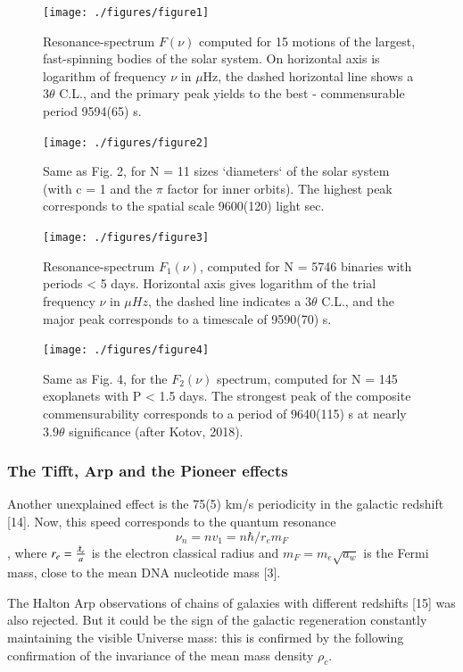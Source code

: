 \documentclass[twoside,draft]{article}
\begin{document}
\begin{sloppypar}
{\begin{figure}
\centering
\texttt{[image: ./figures/figure1]}
\caption{Resonance-spectrum $F(\nu)$ computed for 15 motions of the largest, fast-spinning bodies of
the solar system. On horizontal axis is logarithm of frequency $\nu$ in $\mu$Hz, the dashed horizontal line
shows a $ 3 \theta $ C.L., and the primary peak yields to the best - commensurable period 9594(65) s.}
\label{fig:figure_label}
\end{figure}

\begin{figure}
\centering
\texttt{[image: ./figures/figure2]}
\caption{Same as Fig. 2, for N = 11 sizes `diameters` of the solar system (with c = 1 and the $\pi$
factor for inner orbits). The highest peak corresponds to the spatial scale 9600(120) light sec.}
\label{fig:figure_label}
\end{figure}

\begin{figure}
\centering
\texttt{[image: ./figures/figure3]}
\caption{Resonance-spectrum $F_{1} ( \nu)$, computed for N = 5746 binaries with periods < 5 days.
Horizontal axis gives logarithm of the trial frequency $\nu$ in $\mu Hz$, the dashed line indicates a $3 \theta$
C.L., and the major peak corresponds to a timescale of 9590(70) s.}
\label{fig:figure_label}
\end{figure}

\begin{figure}
\centering
\texttt{[image: ./figures/figure4]}
\caption{Same as Fig. 4, for the $F_{2} ( \nu )$ spectrum, computed for N = 145 exoplanets with P < 1.5
days. The strongest peak of the composite commensurability corresponds to a period of 9640(115) s
at nearly $3.9\theta$ significance (after Kotov, 2018).}
\label{fig:figure_label}
\end{figure}

\subsubsection{The Tifft, Arp and the Pioneer effects}

Another unexplained effect is the 75(5) km/s periodicity in the galactic redshift [14]. Now, this
speed corresponds to the quantum resonance $$\nu_{n} = nv_{1} =n\hbar /r_{e} m_{F} $$, where $r_{e} = \frac{\lambdabar_{e}}{a}$ is the electron classical radius and $m_{F} = m_{e}\sqrt{a_{w}}$ is the Fermi mass, close to the mean DNA nucleotide mass [3].

The Halton Arp observations of chains of galaxies with different redshifts [15] was also
rejected. But it could be the sign of the galactic regeneration constantly maintaining the visible
Universe mass: this is confirmed by the following confirmation of the invariance of the mean mass
density $\rho_{c}$.

}
\end{sloppypar}
\end{document}
